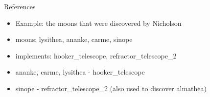 \documentclass[logoontitle,tabu,supertabular,aspectratio=43]{preney-uwindsor-beamer}
\begin{document}


	\begin{frame}[allowframebreaks]{References}
	\printbibliography
	\end{frame}

    \begin{frame}{\insertsection}
        \begin{itemize}

            \item Example: the moons that were discovered by Nicholson
            \item moons: lysithea, ananke, carme, sinope
            \item implements: hooker\_telescope, refractor\_telescope\_2
            \item ananke, carme, lysithea - hooker\_telescope
            \item sinope - refractor\_telescope\_2 (also used to discover almathea)
        \end{itemize}
    \end{frame}
\end{document}
